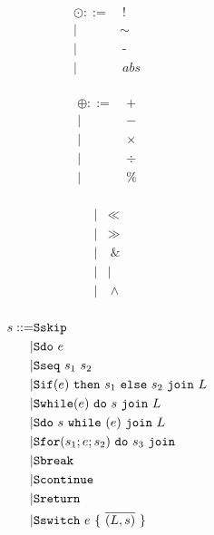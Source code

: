 \documentclass[acmsmall,review,anonymous]{acmart}\settopmatter{printfolios=true,printccs=false,printacmref=false}
\begin{document}
\begin{figure}
  \begin{subfigure}[t]{0.3\textwidth}
    \begin{minipage}[t]{0.4\textwidth}
      \[\begin{aligned}
      \odot ::= & ~ ! \\
      | & \sim \\
      | & ~ \text{-} \\
      | & ~ \mathit{abs} \\
      \end{aligned}\]
    \end{minipage}
    \begin{minipage}[t]{0.3\textwidth}
      \[\begin{aligned}
      \oplus ::= & ~ + \\
      | & ~ - \\
      | & ~ \times \\
      | & ~ \div \\
      | & ~ \% \\
      \end{aligned}\]
    \end{minipage}
    \begin{minipage}[t]{0.25\textwidth}
      \[\begin{aligned}
      | & \ll \\
      | & \gg \\
      | & ~ \& \\
      | & \mid \\
      | & ~ \wedge \\
      \end{aligned}\]
    \end{minipage}
    \[\begin{aligned}
    \stmt ::= & \sskip \\
    | & \sdo{\expr} \\
    | & \sseq{\stmt_1}{\stmt_2} \\
    | & \sifthenelse{\expr}{\stmt_1}{\stmt_2}{L} \\
    | & \swhile{\expr}{\stmt}{L} \\
    | & \sdowhile{\expr}{\stmt}{L} \\
    | & \sfor{\stmt_1}{\expr}{\stmt_2}{\stmt_3} \\
    | & \sbreak \\
    | & \scontinue \\
    | & \sreturn \\
    | & \sswitch{\expr}{\overline{(L,\stmt)}} \\

\end{aligned}\]
\end{subfigure}
\end{figure}
\end{document}
